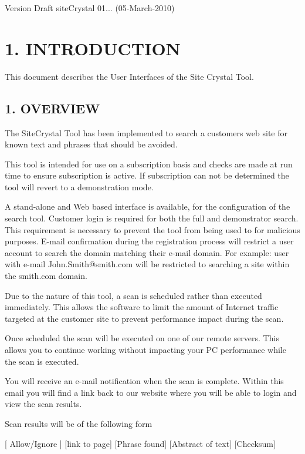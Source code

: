 

\begin{DoxyVersion}{Version}
Draft site\+Crystal 01... (05-\/\+March-\/2010)
\end{DoxyVersion}
\hypertarget{index_sec_1}{}\section{1. 	\+I\+N\+T\+R\+O\+D\+U\+C\+T\+I\+O\+N}\label{index_sec_1}
This document describes the User Interfaces of the Site Crystal Tool.\hypertarget{index_sec_1_1}{}\subsection{1.	\+O\+V\+E\+R\+V\+I\+E\+W}\label{index_sec_1_1}
\begin{DoxyVerb}The SiteCrystal Tool has been implemented to search a customers web site for known text
and phrases that should be avoided.  

This tool is intended for use on a subscription basis and checks are made at run time to 
ensure subscription is active.  If subscription can not be determined the tool will revert
to a demonstration mode. 

A stand-alone and Web based interface is available, for the configuration of the search tool.
Customer login is required for both the full and demonstrator search.  This requirement is 
necessary to prevent the tool from being used to for malicious purposes.  E-mail confirmation 
during the registration process will restrict a user account to search the domain matching 
their e-mail domain.  For example: user with e-mail John.Smith@smith.com will be restricted 
to searching a site within the smith.com domain.

Due to the nature of this tool, a scan is scheduled rather than executed immediately.  This allows the
software to limit the amount of Internet traffic targeted at the customer site to prevent performance 
impact during the scan.

Once scheduled the scan will be executed on one of our remote servers.  This allows you to continue 
working without impacting your PC performance while the scan is executed.

You will receive an e-mail notification when the scan is complete.
Within this email you will find a link back to our website where you will be able to login and view the scan results.

Scan results will be of the following form

[ Allow/Ignore ] [link to page] [Phrase found] [Abstract of text] [Checksum]
\end{DoxyVerb}


